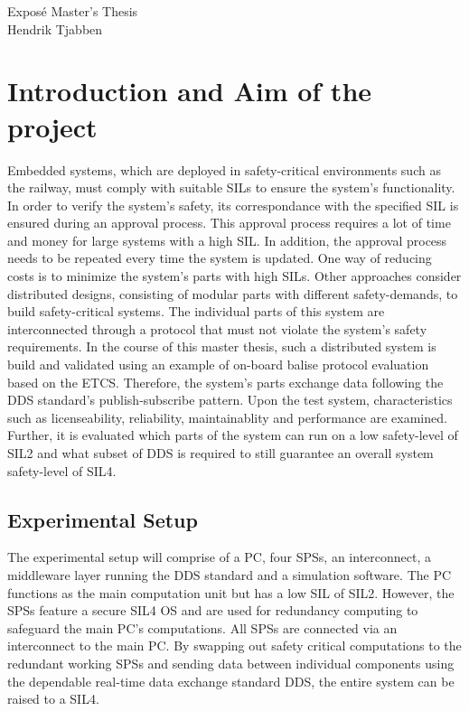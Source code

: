 \documentclass[a4paper, 12pt]{scrartcl}
\begin{document}
\begin{center}
  \Huge{Expos\'{e} Master's Thesis}\\
\Large{Hendrik Tjabben}
\end{center}


\section*{Introduction and Aim of the project}
Embedded systems, which are deployed in safety-critical environments such as the railway, must comply with suitable \acp{SIL} to ensure the system's functionality.
In order to verify the system's safety, its correspondance with the specified \ac{SIL} is ensured during an approval process.
This approval process requires a lot of time and money for large systems with a high \ac{SIL}.
In addition, the approval process needs to be repeated every time the system is updated.
One way of reducing costs is to minimize the system's parts with high \acp{SIL}.
Other approaches consider distributed designs, consisting of modular parts with different safety-demands, to build safety-critical systems.
The individual parts of this system are interconnected through a protocol that must not violate the system's safety requirements.
In the course of this master thesis, such a distributed system is build and validated using an example of on-board balise protocol evaluation based on the \ac{ETCS}.
Therefore, the system's parts exchange data following the \ac{DDS} standard's publish-subscribe pattern.
Upon the test system, characteristics such as licenseability, reliability, maintainablity and performance are examined.
Further, it is evaluated which parts of the system can run on a low safety-level of \ac{SIL}2 and what subset of \ac{DDS} is required to still guarantee an overall system safety-level of \ac{SIL}4.

\subsection*{Experimental Setup}
The experimental setup will comprise of a PC, four \acp{SPS}, an interconnect, a middleware layer running the \ac{DDS} standard and a simulation software.
The PC functions as the main computation unit but has a low \ac{SIL} of \ac{SIL}2.
However, the \acp{SPS} feature a secure \ac{SIL}4 \ac{OS} and are used for redundancy computing to safeguard the main PC's computations.
All \acp{SPS} are connected via an interconnect to the main PC.
By swapping out safety critical computations to the redundant working \acp{SPS} and sending data between individual components using the dependable real-time data exchange standard \ac{DDS}, the entire system can be raised to a \ac{SIL}4.
\end{document}
